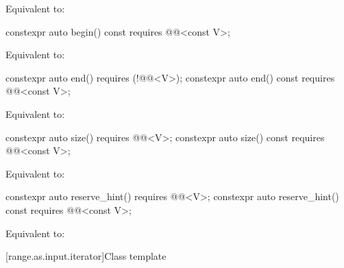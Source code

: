 \begin{itemdescr}
\pnum
\effects
Equivalent to: 
\end{itemdescr}

%
\begin{itemdecl}
constexpr auto begin() const requires @@<const V>;
\end{itemdecl}

\begin{itemdescr}
\pnum
\effects
Equivalent to: 
\end{itemdescr}

%
\begin{itemdecl}
constexpr auto end() requires (!@@<V>);
constexpr auto end() const requires @@<const V>;
\end{itemdecl}

\begin{itemdescr}
\pnum
\effects
Equivalent to: 
\end{itemdescr}

%
\begin{itemdecl}
constexpr auto size() requires @@<V>;
constexpr auto size() const requires @@<const V>;
\end{itemdecl}

\begin{itemdescr}
\pnum
\effects
Equivalent to: 
\end{itemdescr}

%
\begin{itemdecl}
constexpr auto reserve_hint() requires @@<V>;
constexpr auto reserve_hint() const requires @@<const V>;
\end{itemdecl}

\begin{itemdescr}
\pnum
\effects
Equivalent to: 
\end{itemdescr}

[range.as.input.iterator]{Class template }

